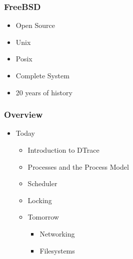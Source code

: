 \documentclass[pdftex]{beamer}
\begin{document}
\begin{frame}
  \frametitle{FreeBSD}
  \begin{itemize}
  \item Open Source
  \item Unix
  \item Posix
  \item Complete System
  \item 20 years of history
  \end{itemize}
\end{frame}

\begin{frame}
  \frametitle{Overview}
  \begin{itemize}
  \item Today
    \begin{itemize}
    \item Introduction to DTrace
    \item Processes and the Process Model
    \item Scheduler
    \item Locking
    \end{itemize}
    \begin{itemize}
    \item Tomorrow
      \begin{itemize}
      \item Networking
      \item Filesystems
      \end{itemize}
    \end{itemize}
  \end{itemize}
\end{frame}
\end{document}

